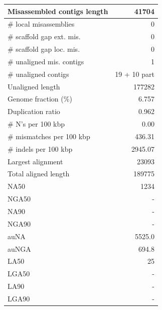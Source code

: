 \documentclass[12pt,a4paper]{article}
\begin{document}
\begin{table}[ht]
\begin{center}
\begin{tabular}{|l*{1}{|r}|}
Misassembled contigs length & 41704 \\ \hline
\# local misassemblies & 0 \\ \hline
\# scaffold gap ext. mis. & 0 \\ \hline
\# scaffold gap loc. mis. & 0 \\ \hline
\# unaligned mis. contigs & 1 \\ \hline
\# unaligned contigs & 19 + 10 part \\ \hline
Unaligned length & 177282 \\ \hline
Genome fraction (\%) & 6.757 \\ \hline
Duplication ratio & 0.962 \\ \hline
\# N's per 100 kbp & 0.00 \\ \hline
\# mismatches per 100 kbp & 436.31 \\ \hline
\# indels per 100 kbp & 2945.07 \\ \hline
Largest alignment & 23093 \\ \hline
Total aligned length & 189775 \\ \hline
NA50 & 1234 \\ \hline
NGA50 & - \\ \hline
NA90 & - \\ \hline
NGA90 & - \\ \hline
auNA & 5525.0 \\ \hline
auNGA & 694.8 \\ \hline
LA50 & 25 \\ \hline
LGA50 & - \\ \hline
LA90 & - \\ \hline
LGA90 & - \\ \hline
\end{tabular}
\end{center}
\end{table}
\end{document}
